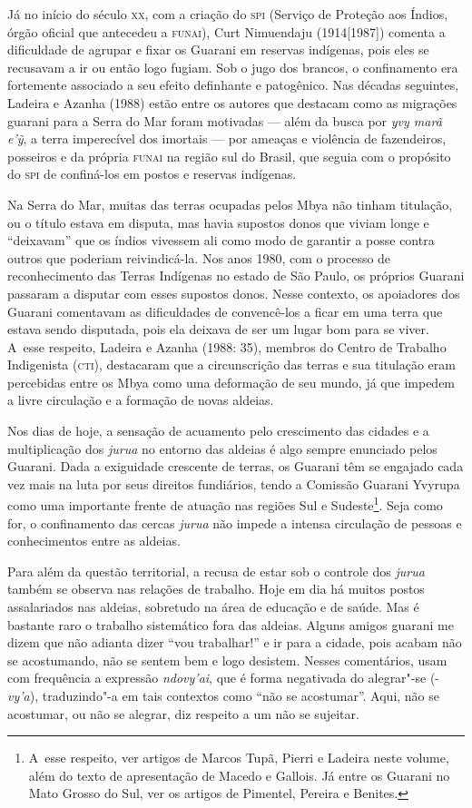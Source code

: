 Já no início do século \textsc{xx}, com a criação do \textsc{spi} (Serviço de Proteção aos
Índios, órgão oficial que antecedeu a \textsc{funai}), Curt Nimuendaju
(1914[1987]) comenta a dificuldade de agrupar e fixar os Guarani em
reservas indígenas, pois eles se recusavam a ir ou então logo fugiam.
Sob o jugo dos brancos, o confinamento era fortemente associado a seu
efeito definhante e patogênico. Nas décadas seguintes, Ladeira e Azanha
(1988) estão entre os autores que destacam como as migrações guarani
para a Serra do Mar foram motivadas --- além da busca por \emph{yvy marã
e’\~{y}}, a terra imperecível dos imortais --- por ameaças e violência de
fazendeiros, posseiros e da própria \textsc{funai} na região sul do Brasil, que
seguia com o propósito do \textsc{spi} de confiná-los em postos e reservas
indígenas.

Na Serra do Mar, muitas das terras ocupadas pelos Mbya não tinham
titulação, ou o título estava em disputa, mas havia supostos donos que
viviam longe e ``deixavam'' que os índios vivessem ali como modo de
garantir a posse contra outros que poderiam reivindicá-la. Nos anos
1980, com o processo de reconhecimento das Terras Indígenas no estado
de São Paulo, os próprios Guarani passaram a disputar com esses
supostos donos. Nesse contexto, os apoiadores dos Guarani comentavam as
dificuldades de convencê-los a ficar em uma terra que estava sendo
disputada, pois ela deixava de ser um lugar bom para se viver. A~esse
respeito, Ladeira e Azanha (1988: 35), membros do Centro de Trabalho
Indigenista (\textsc{cti}), destacaram que a circunscrição das terras e sua
titulação eram percebidas entre os Mbya como uma deformação de seu
mundo, já que impedem a livre circulação e a formação de novas aldeias.

Nos dias de hoje, a sensação de acuamento pelo crescimento das cidades e
a multiplicação dos \emph{jurua} no entorno das aldeias é algo sempre
enunciado pelos Guarani. Dada a exiguidade crescente de terras, os
Guarani têm se engajado cada vez mais na luta por seus direitos
fundiários, tendo a Comissão Guarani Yvyrupa como uma importante frente
de atuação nas regiões Sul e Sudeste\footnote{A~esse respeito, ver
artigos de Marcos Tupã, Pierri e Ladeira neste volume, além do texto de
apresentação de Macedo e Gallois. Já entre os Guarani no Mato Grosso do
Sul, ver os artigos de Pimentel, Pereira e Benites.}. Seja como for, o
confinamento das cercas \emph{jurua} não impede a intensa circulação de
pessoas e conhecimentos entre as aldeias. 

Para além da questão territorial, a recusa de estar sob o controle dos
\emph{jurua} também se observa nas relações de trabalho. Hoje em dia há muitos
postos assalariados nas aldeias, sobretudo na área de educação e de
saúde. Mas é bastante raro o trabalho sistemático fora das aldeias.
Alguns amigos guarani me dizem que não adianta dizer ``vou trabalhar!'' e
ir para a cidade, pois acabam não se acostumando, não se sentem bem e
logo desistem. Nesses comentários, usam com frequência a expressão
\emph{ndovy’ai}, que é forma negativada do alegrar"-se (-\emph{vy'a}), traduzindo"-a em
tais contextos como ``não se acostumar''. Aqui, não se acostumar, ou não
se alegrar, diz respeito a um não se sujeitar.

